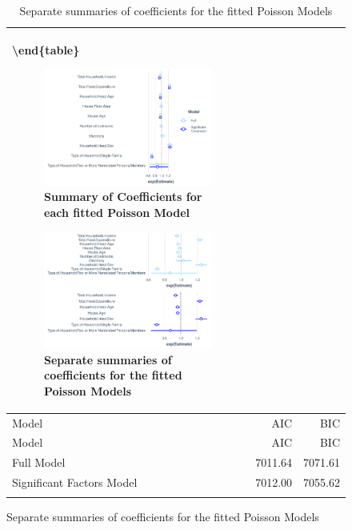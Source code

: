 \documentclass[
]{article}
\begin{document}
\begin{figure}[H]
\begin{table}[H]
\begin{tabular}[t]{lrr}
\textbackslash end\{table\}

\begin{figure}[H]

{\centering \includegraphics[width=0.8\linewidth]{Group_01_Project2_demo_files/figure-latex/summary plot-1} 

}

\caption{Summary of Coefficients for each fitted Poisson Model}\label{fig:summary plot}
\end{figure}

\begin{figure}[H]

{\centering \includegraphics[width=0.8\linewidth]{Group_01_Project2_demo_files/figure-latex/separate summary plots-1} 

}

\caption{Separate summaries of coefficients for the fitted Poisson Models}\label{fig:separate summary plots}
\end{figure}

\begin{longtable}[]{@{}lrr@{}}
\caption{Comparison of Fitted Poisson Models}\tabularnewline
\toprule
Model & AIC & BIC\tabularnewline
\midrule
\endfirsthead
\toprule
Model & AIC & BIC\tabularnewline
\midrule
\endhead
Full Model & 7011.64 & 7071.61\tabularnewline
Significant Factors Model & 7012.00 & 7055.62\tabularnewline
\bottomrule
\end{longtable}


\end{tabular}
\end{table}
\end{figure}
\end{document}
